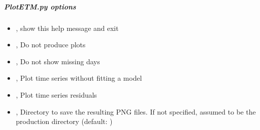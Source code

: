 \documentclass[letterpaper,10pt,english]{sphinxmanual}
\begin{document}
\subparagraph{PlotETM.py options}
\label{\detokenize{pgamit.com:PlotETM.py-options}}\begin{itemize}
\item {} 
\sphinxAtStartPar
{\hyperref[\detokenize{pgamit.com:PlotETM.py--h}]{}}, {\hyperref[\detokenize{pgamit.com:PlotETM.py---help}]{}} \sphinxhyphen{} show this help message and exit

\item {} 
\sphinxAtStartPar
{\hyperref[\detokenize{pgamit.com:PlotETM.py--nop}]{}}, {\hyperref[\detokenize{pgamit.com:PlotETM.py---no_plots}]{}} \sphinxhyphen{} Do not produce plots

\item {} 
\sphinxAtStartPar
{\hyperref[\detokenize{pgamit.com:PlotETM.py--nom}]{}}, {\hyperref[\detokenize{pgamit.com:PlotETM.py---no_missing_data}]{}} \sphinxhyphen{} Do not show missing days

\item {} 
\sphinxAtStartPar
{\hyperref[\detokenize{pgamit.com:PlotETM.py--nm}]{}}, {\hyperref[\detokenize{pgamit.com:PlotETM.py---no_model}]{}} \sphinxhyphen{} Plot time series without fitting a model

\item {} 
\sphinxAtStartPar
{\hyperref[\detokenize{pgamit.com:PlotETM.py--r}]{}}, {\hyperref[\detokenize{pgamit.com:PlotETM.py---residuals}]{}} \sphinxhyphen{} Plot time series residuals

\item {} 
\sphinxAtStartPar
{\hyperref[\detokenize{pgamit.com:PlotETM.py--dir}]{}} , {\hyperref[\detokenize{pgamit.com:PlotETM.py---directory}]{}}  \sphinxhyphen{} Directory to save the resulting PNG files. If not specified, assumed to be the production directory (default: )


\end{itemize}
\end{document}
